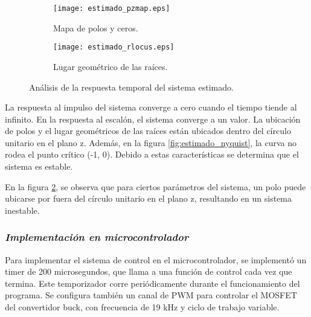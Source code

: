 \begin{figure}[H]
    \centering

    \begin{subfigure}[b]{0.49\textwidth}
        \centering
        \texttt{[image: estimado\_pzmap.eps]}
        \caption{Mapa de polos y ceros.}
        \label{fig:estimado_pzmap}
    \end{subfigure}
    \begin{subfigure}[b]{0.49\textwidth}
        \centering
        \texttt{[image: estimado\_rlocus.eps]}
        \caption{Lugar geométrico de las raíces.}
        \label{fig:estimado_rlocus}
    \end{subfigure}

    \vspace{-0.25cm}
    \caption{Análisis de la respuesta temporal del sistema estimado.}
    \label{fig:estimado_estabilidad}
\end{figure}
\vspace{-0.5cm}

La respuesta al impulso del sistema converge a cero cuando el tiempo tiende al infinito.
En la respuesta al escalón, el sistema converge a un valor.
La ubicación de polos y el lugar geométricos de las raíces están ubicados dentro 
del círculo unitario en el plano z. Además, en la figura \ref{fig:estimado_nyquist}, la curva no rodea
el punto crítico (-1, 0). Debido a estas características se determina que el sistema es estable.

En la figura \ref{fig:estimado_rlocus}, se observa que para ciertos parámetros del sistema, un polo puede
ubicarse por fuera del círculo unitario en el plano z, resultando en un sistema inestable.

\subsubsection*{\it{Implementación en microcontrolador}}
\vspace{-0.25cm}

Para implementar el sistema de control en el microcontrolador, se implementó un timer de 200 microsegundos,
que llama a una función de control cada vez que termina. Este temporizador corre periódicamente durante el funcionamiento
del programa. Se configura también un canal de PWM para controlar el MOSFET del convertidor buck, con frecuencia de 19 kHz
y ciclo de trabajo variable.

